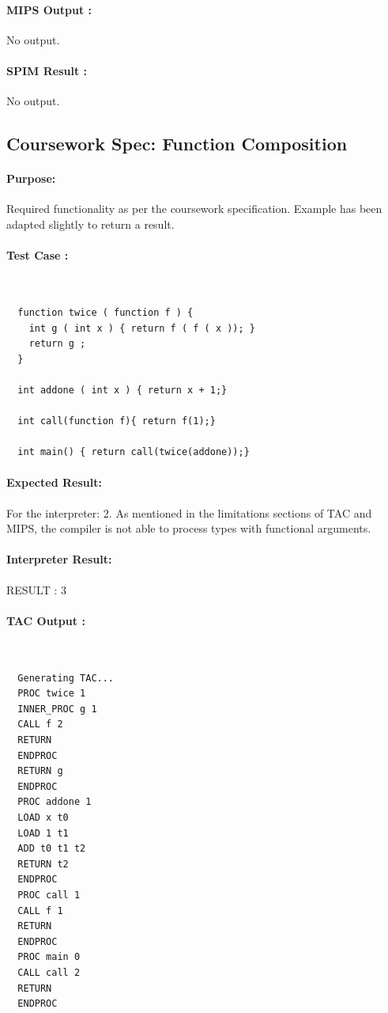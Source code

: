 \documentclass[12pt]{article}
\begin{document}
\paragraph{MIPS Output : }No output.
\paragraph{SPIM Result :}No output.

\subsection{Coursework Spec: Function Composition}
\paragraph{Purpose:}Required functionality as per the coursework specification. Example has been adapted slightly to return a result.
\paragraph{Test Case :}~\\
\begin{lstlisting}
  function twice ( function f ) {
    int g ( int x ) { return f ( f ( x )); }
    return g ;
  }

  int addone ( int x ) { return x + 1;}

  int call(function f){ return f(1);}

  int main() { return call(twice(addone));}
\end{lstlisting}
\paragraph{Expected Result:} For the interpreter: 2. As mentioned in the limitations sections of TAC and MIPS, the compiler is not able to process types with functional arguments. 
\paragraph{Interpreter Result:} RESULT : 3
\paragraph{TAC Output : }~\\
\begin{lstlisting}
  Generating TAC...
  PROC twice 1
  INNER_PROC g 1
  CALL f 2
  RETURN
  ENDPROC
  RETURN g
  ENDPROC
  PROC addone 1
  LOAD x t0
  LOAD 1 t1
  ADD t0 t1 t2
  RETURN t2
  ENDPROC
  PROC call 1
  CALL f 1
  RETURN
  ENDPROC
  PROC main 0
  CALL call 2
  RETURN
  ENDPROC
\end{lstlisting}
\end{document}
